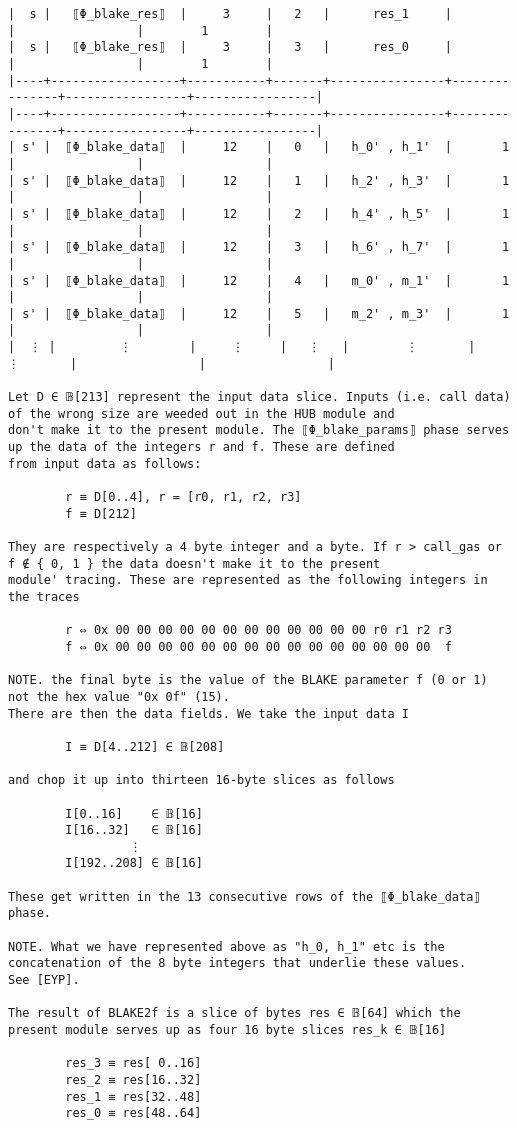\documentclass[varwidth=\maxdimen,margin=0.5cm,multi={verbatim}]{standalone}
\begin{document}
\begin{verbatim}
|  s |   ⟦Φ_blake_res⟧  |     3     |   2   |      res_1     |               |                 |        1        |
|  s |   ⟦Φ_blake_res⟧  |     3     |   3   |      res_0     |               |                 |        1        |
|----+------------------+-----------+-------+----------------+---------------+-----------------+-----------------|
|----+------------------+-----------+-------+----------------+---------------+-----------------+-----------------|
| s' |  ⟦Φ_blake_data⟧  |     12    |   0   |   h_0' , h_1'  |       1       |                 |                 |
| s' |  ⟦Φ_blake_data⟧  |     12    |   1   |   h_2' , h_3'  |       1       |                 |                 |
| s' |  ⟦Φ_blake_data⟧  |     12    |   2   |   h_4' , h_5'  |       1       |                 |                 |
| s' |  ⟦Φ_blake_data⟧  |     12    |   3   |   h_6' , h_7'  |       1       |                 |                 |
| s' |  ⟦Φ_blake_data⟧  |     12    |   4   |   m_0' , m_1'  |       1       |                 |                 |
| s' |  ⟦Φ_blake_data⟧  |     12    |   5   |   m_2' , m_3'  |       1       |                 |                 |
|  ⋮ |         ⋮        |     ⋮     |   ⋮   |        ⋮       |       ⋮       |                 |                 |

Let D ∈ 𝔹[213] represent the input data slice. Inputs (i.e. call data) of the wrong size are weeded out in the HUB module and
don't make it to the present module. The ⟦Φ_blake_params⟧ phase serves up the data of the integers r and f. These are defined
from input data as follows:

        r ≡ D[0..4], r = [r0, r1, r2, r3]
        f ≡ D[212]

They are respectively a 4 byte integer and a byte. If r > call_gas or f ∉ { 0, 1 } the data doesn't make it to the present
module' tracing. These are represented as the following integers in the traces

        r ⇔ 0x 00 00 00 00 00 00 00 00 00 00 00 00 r0 r1 r2 r3
        f ⇔ 0x 00 00 00 00 00 00 00 00 00 00 00 00 00 00 00  f

NOTE. the final byte is the value of the BLAKE parameter f (0 or 1) not the hex value "0x 0f" (15).
There are then the data fields. We take the input data I

        I ≡ D[4..212] ∈ 𝔹[208]

and chop it up into thirteen 16-byte slices as follows

        I[0..16]    ∈ 𝔹[16]
        I[16..32]   ∈ 𝔹[16]
                 ⋮
        I[192..208] ∈ 𝔹[16]

These get written in the 13 consecutive rows of the ⟦Φ_blake_data⟧ phase.

NOTE. What we have represented above as "h_0, h_1" etc is the concatenation of the 8 byte integers that underlie these values.
See [EYP].

The result of BLAKE2f is a slice of bytes res ∈ 𝔹[64] which the present module serves up as four 16 byte slices res_k ∈ 𝔹[16]

        res_3 ≡ res[ 0..16]
        res_2 ≡ res[16..32]
        res_1 ≡ res[32..48]
        res_0 ≡ res[48..64]
\end{verbatim}
\end{document}

